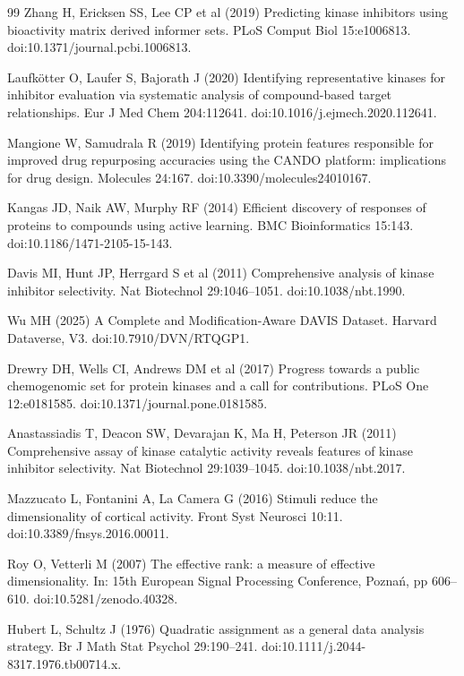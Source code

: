 \begin{thebibliography}{99}
 Zhang H, Ericksen SS, Lee CP et al (2019)
Predicting kinase inhibitors using bioactivity matrix derived informer sets.
PLoS Comput Biol 15:e1006813. doi:10.1371/journal.pcbi.1006813.

 Laufk\"otter O, Laufer S, Bajorath J (2020)
Identifying representative kinases for inhibitor evaluation via systematic
analysis of compound-based target relationships. Eur J Med Chem 204:112641.
doi:10.1016/j.ejmech.2020.112641.

 Mangione W, Samudrala R (2019) Identifying protein
features responsible for improved drug repurposing accuracies using the CANDO
platform: implications for drug design. Molecules 24:167.
doi:10.3390/molecules24010167.

 Kangas JD, Naik AW, Murphy RF (2014) Efficient
discovery of responses of proteins to compounds using active learning. BMC
Bioinformatics 15:143. doi:10.1186/1471-2105-15-143.

 Davis MI, Hunt JP, Herrgard S et al (2011) Comprehensive
analysis of kinase inhibitor selectivity. Nat Biotechnol 29:1046--1051.
doi:10.1038/nbt.1990.

 Wu MH (2025) A Complete and Modification-Aware DAVIS
Dataset. Harvard Dataverse, V3. doi:10.7910/DVN/RTQGP1.

 Drewry DH, Wells CI, Andrews DM et al (2017) Progress
towards a public chemogenomic set for protein kinases and a call for
contributions. PLoS One 12:e0181585. doi:10.1371/journal.pone.0181585.

 Anastassiadis T, Deacon SW, Devarajan K,
Ma H, Peterson JR (2011) Comprehensive assay of kinase catalytic activity
reveals features of kinase inhibitor selectivity. Nat Biotechnol 29:1039--1045.
doi:10.1038/nbt.2017.

 Mazzucato L, Fontanini A, La Camera G (2016) Stimuli
reduce the dimensionality of cortical activity. Front Syst Neurosci 10:11.
doi:10.3389/fnsys.2016.00011.

 Roy O, Vetterli M (2007) The effective rank: a measure of
effective dimensionality. In: 15th European Signal Processing Conference,
Pozna\'n, pp 606--610. doi:10.5281/zenodo.40328.

 Hubert L, Schultz J (1976) Quadratic assignment as a
general data analysis strategy. Br J Math Stat Psychol 29:190--241.
doi:10.1111/j.2044-8317.1976.tb00714.x.


\end{thebibliography}
